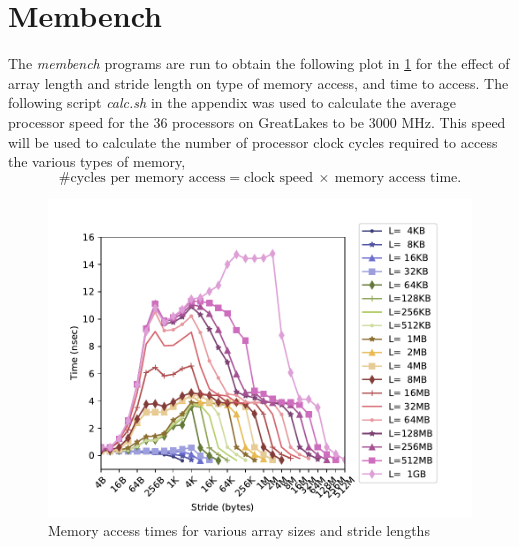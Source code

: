 \documentclass[letterpaper]{article}
\title{\large \doctitle}
\author{}
\date{}%
\begin{document}
\maketitle
\pagestyle{fancy}




\section{Membench}
The \textit{membench} programs are run to obtain the following plot in \cref{fig:membench} for the effect of array length and stride length on type of memory access, and time to access. The following script \textit{calc.sh} in the appendix was used to calculate the average processor speed for the $36$ processors on GreatLakes to be 3000 MHz. This speed will be used to calculate the number of processor clock cycles required to access the various types of memory, 
$$\textrm{\# cycles per memory access} = \textrm{clock speed}~\times~\textrm{memory access time}.$$





\begin{figure}[H]
  \centering
  \includegraphics[width=\textwidth]{figures/membench.pdf}
  \caption{Memory access times for various array sizes and stride lengths}
  \label{fig:membench}
\end{figure}
\end{document}
